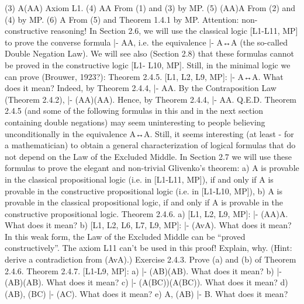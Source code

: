 (3) A\IMPLIES (\neg A\IMPLIES A) Axiom L1.
(4) \neg A\IMPLIES A From (1) and (3) by MP.
(5) (\neg A\IMPLIES \neg A)\IMPLIES \neg \neg A From (2) and (4) by MP.
(6) \neg \neg A From (5) and Theorem 1.4.1 by MP.
Attention: non-constructive reasoning! In Section 2.6, we will use the classical logic [L1-L11, MP] to
prove the converse formula |- \neg \neg A\IMPLIES A, i.e. the equivalence |- \neg \neg A↔A (the so-called Double Negation
Law). We will see also (Section 2.8) that these formulas cannot be proved in the constructive logic [L1-
L10, MP].
Still, in the minimal logic we can prove (Brouwer, 1923?):
Theorem 2.4.5. [L1, L2, L9, MP]: |- \neg \neg \neg A↔\neg A. What does it mean?
Indeed, by Theorem 2.4.4, |- \neg A\IMPLIES \neg \neg \neg A. By the Contraposition Law (Theorem 2.4.2), |-
(A\IMPLIES \neg \neg A)\IMPLIES (\neg \neg \neg A\IMPLIES \neg A). Hence, by Theorem 2.4.4, |- \neg \neg \neg A\IMPLIES \neg A. Q.E.D.
Theorem 2.4.5 (and some of the following formulas in this and in the next section containing double
negations) may seem uninteresting to people believing unconditionally in the equivalence \neg \neg A↔A. Still,
it seems interesting (at least - for a mathematician) to obtain a general characterization of logical formulas
that do not depend on the Law of the Excluded Middle. In Section 2.7 we will use these formulas to prove
the elegant and non-trivial Glivenko's theorem: a) A is provable in the classical propositional logic (i.e. in
[L1-L11, MP]), if and only if \neg \neg A is provable in the constructive propositional logic (i.e. in [L1-L10,
MP]), b) \neg A is provable in the classical propositional logic, if and only if \neg A is provable in the
constructive propositional logic.
Theorem 2.4.6. a) [L1, L2, L9, MP]: |- (\neg A\IMPLIES A)\IMPLIES \neg \neg A. What does it mean?
b) [L1, L2, L6, L7, L9, MP]: |- \neg \neg (Av\neg A). What does it mean? In this weak form, the Law of the Excluded
Middle can be ``proved constructively''. The axiom L11 can't be used in this proof! Explain, why. (Hint:
derive a contradiction from \neg (Av\neg A).)
Exercise 2.4.3. Prove (a) and (b) of Theorem 2.4.6.
Theorem 2.4.7. [L1-L9, MP]: a) |- (A\IMPLIES B)\IMPLIES (\neg \neg A\IMPLIES \neg \neg B). What does it mean?
b) |- \neg \neg (A\IMPLIES B)\IMPLIES (\neg \neg A\IMPLIES \neg \neg B). What does it mean?
c) |- (A\IMPLIES (B\IMPLIES C))\IMPLIES (\neg \neg A\IMPLIES (\neg \neg B\IMPLIES \neg \neg C)). What does it mean?
d) \neg \neg (A\IMPLIES B), \neg \neg (B\IMPLIES C) |- \neg \neg (A\IMPLIES C). What does it mean?
e) \neg \neg A, \neg \neg (A\IMPLIES B) |- \neg \neg B. What does it mean?
